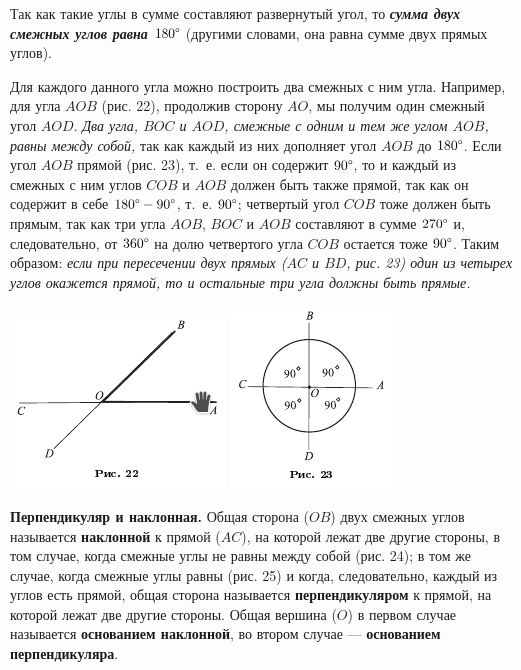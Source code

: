 \documentclass[oneside]{book}
\begin{document}
Так как такие углы в сумме составляют развернутый угол, то \textbf{\emph{сумма двух смежных углов равна $180\degree$}} (другими словами, она равна сумме двух прямых углов).

Для каждого данного угла можно построить два смежных с ним угла.
Например, для угла $AOB$ (рис. 22), продолжив сторону $AO$, мы получим один смежный угол $AOD$.
\emph{Два угла, $BOC$ и $AOD$, смежные с одним и тем же углом $AOB$, равны между собой,} так как каждый из них дополняет угол $AOB$ до $180\degree$.
Если угол $AOB$ прямой (рис. 23), т.~е. если он содержит $90\degree$, то и каждый из смежных с ним углов $COB$ и $AOB$ должен быть также прямой, так как он содержит в себе $180\degree-90\degree$, т.~е. $90\degree$;
четвертый угол $COB$ тоже должен быть прямым, так как три угла $AOB$, $BOC$ и $AOB$ составляют в сумме $270\degree$ и, следовательно, от $360\degree$ на долю четвертого угла $COB$ остается тоже $90\degree$.
Таким образом:
\emph{если при пересечении двух прямых \emph{($AC$ и $BD$, рис. 23)} один из четырех углов окажется прямой, то и остальные три угла должны быть прямые.}

\includegraphics{pics/ris-22}
\includegraphics{pics/ris-23}

\textbf{Перпендикуляр и наклонная.}
Общая сторона ($OB$) двух смежных углов называется \textbf{наклонной} к прямой ($AC$), на которой лежат две другие стороны, в том случае, когда смежные углы не равны между собой (рис. 24);
в том же случае, когда смежные углы равны (рис. 25) и когда, следовательно, каждый из углов есть прямой, общая сторона называется \textbf{перпендикуляром} к прямой, на которой лежат две другие стороны.
Общая вершина ($O$) в первом случае называется \textbf{основанием наклонной}, во втором случае — \textbf{основанием перпендикуляра}.
\end{document}
